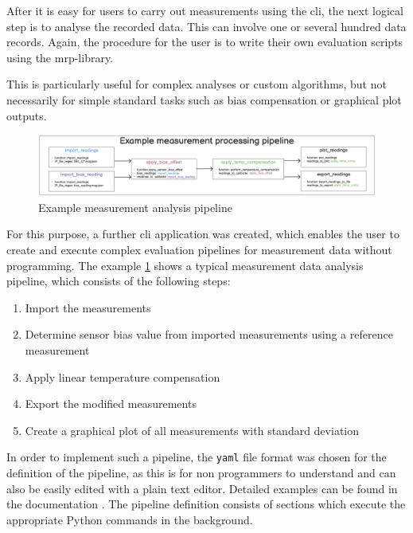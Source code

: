 After it is easy for users to carry out measurements using the
\gls{cli}, the next logical step is to analyse the recorded data. This
can involve one or several hundred data records. Again, the procedure
for the user is to write their own evaluation scripts using the
\gls{mrp}-library.

This is particularly useful for complex analyses or custom algorithms,
but not necessarily for simple standard tasks such as bias compensation
or graphical plot outputs.

\begin{figure}
\centering
\includegraphics{./generated_images/border_Example_measurement_analysis_pipeline.png}
\caption{Example measurement analysis pipeline
\label{Example_measurement_analysis_pipeline.png}}
\end{figure}

For this purpose, a further \gls{cli} application was created, which
enables the user to create and execute complex evaluation pipelines for
measurement data without programming. The example
\ref{Example_measurement_analysis_pipeline.png} shows a typical
measurement data analysis pipeline, which consists of the following
steps:

\begin{enumerate}
\def\labelenumi{\arabic{enumi}.}
\tightlist
\item
  Import the measurements
\item
  Determine sensor bias value from imported measurements using a
  reference measurement
\item
  Apply linear temperature compensation
\item
  Export the modified measurements
\item
  Create a graphical plot of all measurements with standard deviation
\end{enumerate}

In order to implement such a pipeline, the
\passthrough{\lstinline!yaml!} file format was chosen for the definition
of the pipeline, as this is for non programmers to understand and can
also be easily edited with a plain text editor. Detailed examples can be
found in the documentation
\cite{MagneticReadoutProcessingReadTheDocs}. The pipeline definition
consists of sections which execute the appropriate Python commands in
the background.

